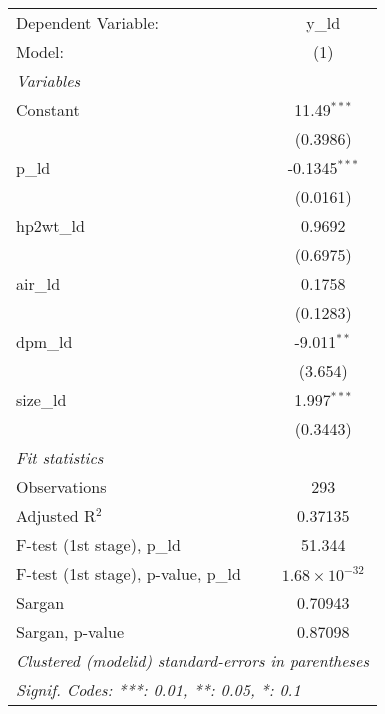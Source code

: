 
\begingroup
\centering
\begin{tabular}{lc}
   \tabularnewline \midrule \midrule
   Dependent Variable:                 & y\_ld\\   
   Model:                              & (1)\\  
   \midrule
   \emph{Variables}\\
   Constant                            & 11.49$^{***}$\\   
                                       & (0.3986)\\   
   p\_ld                               & -0.1345$^{***}$\\   
                                       & (0.0161)\\   
   hp2wt\_ld                           & 0.9692\\   
                                       & (0.6975)\\   
   air\_ld                             & 0.1758\\   
                                       & (0.1283)\\   
   dpm\_ld                             & -9.011$^{**}$\\   
                                       & (3.654)\\   
   size\_ld                            & 1.997$^{***}$\\   
                                       & (0.3443)\\   
   \midrule
   \emph{Fit statistics}\\
   Observations                        & 293\\  
   Adjusted R$^2$                      & 0.37135\\  
   F-test (1st stage), p\_ld           & 51.344\\  
   F-test (1st stage), p-value, p\_ld  & $1.68\times 10^{-32}$\\   
   Sargan                              & 0.70943\\  
   Sargan, p-value                     & 0.87098\\  
   \midrule \midrule
   \multicolumn{2}{l}{\emph{Clustered (modelid) standard-errors in parentheses}}\\
   \multicolumn{2}{l}{\emph{Signif. Codes: ***: 0.01, **: 0.05, *: 0.1}}\\
\end{tabular}
\par\endgroup


